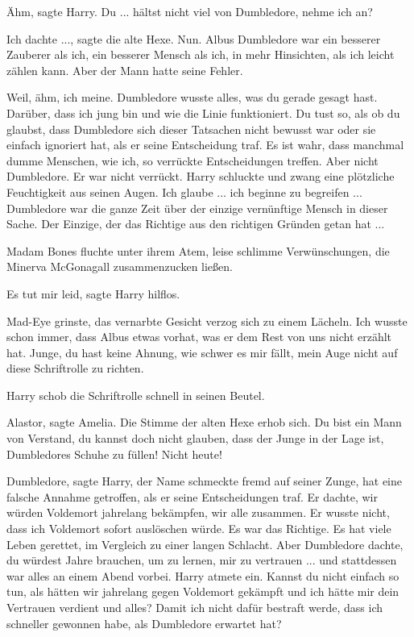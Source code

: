\glqq{}Ähm\grqq{}, sagte Harry. \glqq{}Du ... hältst nicht viel von Dumbledore,
nehme ich an?\grqq{}

\glqq{}Ich dachte ...\grqq{}, sagte die alte Hexe. \glqq{}Nun. Albus Dumbledore
war ein besserer Zauberer als ich, ein besserer Mensch als ich, in mehr
Hinsichten, als ich leicht zählen kann. Aber der Mann hatte seine Fehler.\grqq{}

\glqq{}Weil, ähm, ich meine. Dumbledore wusste alles, was du gerade gesagt hast.
Darüber, dass ich jung bin und wie die Linie funktioniert. Du tust so, als ob du
glaubst, dass Dumbledore sich dieser Tatsachen nicht bewusst war oder sie
einfach ignoriert hat, als er seine Entscheidung traf. Es ist wahr, dass
manchmal dumme Menschen, wie ich, so verrückte Entscheidungen treffen. Aber
nicht Dumbledore. Er war nicht verrückt.\grqq{} Harry schluckte und zwang eine
plötzliche Feuchtigkeit aus seinen Augen. \glqq{}Ich glaube ... ich beginne zu
begreifen ... Dumbledore war die ganze Zeit über der einzige vernünftige Mensch
in dieser Sache. Der Einzige, der das Richtige aus den richtigen Gründen getan
hat ...\grqq{}

Madam Bones fluchte unter ihrem Atem, leise schlimme Verwünschungen, die Minerva
McGonagall zusammenzucken ließen.

\glqq{}Es tut mir leid\grqq{}, sagte Harry hilflos.

Mad-Eye grinste, das vernarbte Gesicht verzog sich zu einem Lächeln. \glqq{}Ich
wusste schon immer, dass Albus etwas vorhat, was er dem Rest von uns nicht
erzählt hat. Junge, du hast keine Ahnung, wie schwer es mir fällt, mein Auge
nicht auf diese Schriftrolle zu richten.\grqq{}

Harry schob die Schriftrolle schnell in seinen Beutel.

\glqq{}Alastor\grqq{}, sagte Amelia. Die Stimme der alten Hexe erhob sich. \glqq{}
Du bist ein Mann von Verstand, du kannst doch nicht glauben, dass der Junge in
der Lage ist, Dumbledores Schuhe zu füllen! Nicht heute!\grqq{}

\glqq{}Dumbledore\grqq{}, sagte Harry, der Name schmeckte fremd auf seiner Zunge,
\glqq{}hat eine falsche Annahme getroffen, als er seine Entscheidungen traf. Er
dachte, wir würden Voldemort jahrelang bekämpfen, wir alle zusammen. Er wusste
nicht, dass ich Voldemort sofort auslöschen würde. Es war das Richtige. Es hat
viele Leben gerettet, im Vergleich zu einer langen Schlacht. Aber Dumbledore
dachte, du würdest Jahre brauchen, um zu lernen, mir zu vertrauen ... und
stattdessen war alles an einem Abend vorbei.\grqq{} Harry atmete ein. \glqq{}Kannst du
nicht einfach so tun, als hätten wir jahrelang gegen Voldemort gekämpft und ich
hätte mir dein Vertrauen verdient und alles? Damit ich nicht dafür bestraft
werde, dass ich schneller gewonnen habe, als Dumbledore erwartet hat?\grqq{}

